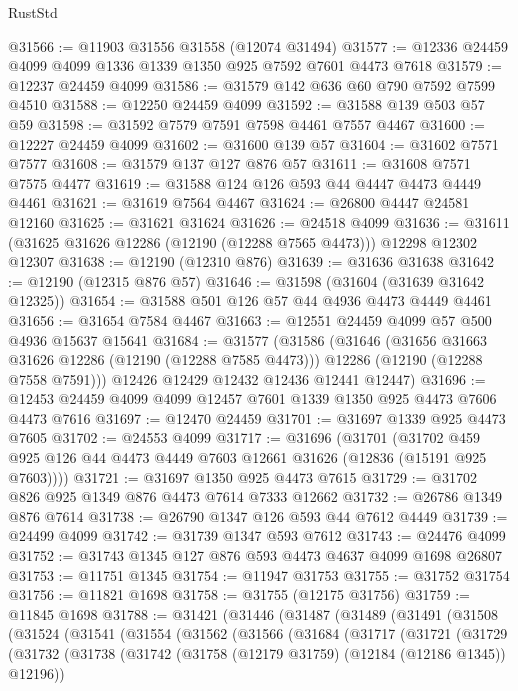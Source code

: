 \begin{lexlean}{RustStd}
\begin{coremodule}
@31566 := @11903 @31556 @31558 (@12074 @31494)
@31577 := @12336 @24459 @4099 @4099 @1336 @1339 @1350 @925 @7592 @7601 @4473 @7618
@31579 := @12237 @24459 @4099
@31586 := @31579 @142 @636 @60 @790 @7592 @7599 @4510
@31588 := @12250 @24459 @4099
@31592 := @31588 @139 @503 @57 @59
@31598 := @31592 @7579 @7591 @7598 @4461 @7557 @4467
@31600 := @12227 @24459 @4099
@31602 := @31600 @139 @57
@31604 := @31602 @7571 @7577
@31608 := @31579 @137 @127 @876 @57
@31611 := @31608 @7571 @7575 @4477
@31619 := @31588 @124 @126 @593 @44 @4447 @4473 @4449 @4461
@31621 := @31619 @7564 @4467
@31624 := @26800 @4447 @24581 @12160
@31625 := @31621 @31624
@31626 := @24518 @4099
@31636 := @31611 (@31625 @31626 @12286 (@12190 (@12288 @7565 @4473))) @12298 @12302 @12307
@31638 := @12190 (@12310 @876)
@31639 := @31636 @31638
@31642 := @12190 (@12315 @876 @57)
@31646 := @31598 (@31604 (@31639 @31642 @12325))
@31654 := @31588 @501 @126 @57 @44 @4936 @4473 @4449 @4461
@31656 := @31654 @7584 @4467
@31663 := @12551 @24459 @4099 @57 @500 @4936 @15637 @15641
@31684 := @31577
    (@31586
      (@31646
        (@31656 @31663 @31626 @12286 (@12190 (@12288 @7585 @4473)))
        @12286
        (@12190 (@12288 @7558 @7591)))
      @12426
      @12429
      @12432
      @12436
      @12441
      @12447)
@31696 := @12453 @24459 @4099 @4099 @12457 @7601 @1339 @1350 @925 @4473 @7606 @4473 @7616
@31697 := @12470 @24459
@31701 := @31697 @1339 @925 @4473 @7605
@31702 := @24553 @4099
@31717 := @31696
    (@31701
      (@31702 @459 @925 @126 @44 @4473 @4449 @7603 @12661 @31626 (@12836 (@15191 @925 @7603))))
@31721 := @31697 @1350 @925 @4473 @7615
@31729 := @31702 @826 @925 @1349 @876 @4473 @7614 @7333 @12662
@31732 := @26786 @1349 @876 @7614
@31738 := @26790 @1347 @126 @593 @44 @7612 @4449
@31739 := @24499 @4099
@31742 := @31739 @1347 @593 @7612
@31743 := @24476 @4099
@31752 := @31743 @1345 @127 @876 @593 @4473 @4637 @4099 @1698 @26807
@31753 := @11751 @1345
@31754 := @11947 @31753
@31755 := @31752 @31754
@31756 := @11821 @1698
@31758 := @31755 (@12175 @31756)
@31759 := @11845 @1698
@31788 := @31421
    (@31446
      (@31487
        (@31489
          (@31491
            (@31508
              (@31524
                (@31541
                  (@31554
                    (@31562
                      (@31566
                        (@31684
                          (@31717
                            (@31721
                              (@31729
                                (@31732
                                  (@31738
                                    (@31742 (@31758 (@12179 @31759) (@12184 (@12186 @1345)) @12196))

\end{coremodule}
\end{lexlean}
